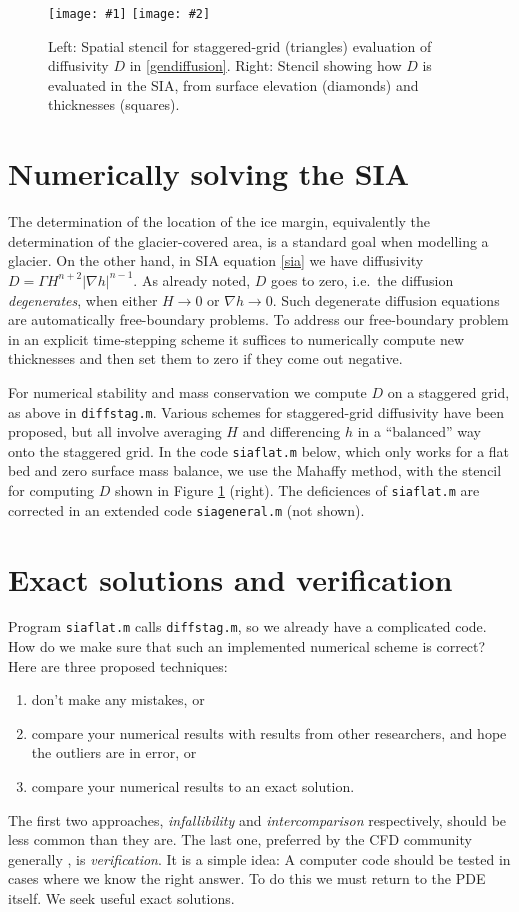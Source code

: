 \documentclass[letterpaper,final,12pt,reqno]{amsart}
\newcommand{\grad}{\nabla}
\newcommand{\minput}[1]{
\vspace{0.8cm}
\VerbatimInput[frame=single,framesep=3mm,label=\fbox{\normalsize \textsl{\,#1.m\,}},fontfamily=courier,fontsize=\footnotesize]{tmp/#1.slim.m}
\vspace{0.5cm}
}
\newcommand{\twofigsizes}[5]{
\begin{figure}[ht]
\centering
\texttt{[image: \#1]} \quad
\texttt{[image: \#2]}
\caption{#3}
\label{fig:#1}
\end{figure}}
\begin{document}
\twofigsizes{diffstencil}{mahaffystencil}{Left:  Spatial stencil for staggered-grid (triangles) evaluation of diffusivity $D$ in \eqref{gendiffusion}.  Right: Stencil showing how $D$ is evaluated in the SIA, from surface elevation (diamonds) and thicknesses (squares).}{2.2in}{2.2in}


\section{Numerically solving the SIA} \label{sec:numericalsia}

The determination of the location of the ice margin, equivalently the determination of the glacier-covered area, is a standard goal when modelling a glacier.  On the other hand, in SIA equation \eqref{sia} we have diffusivity $D = \Gamma H^{n+2} |\grad h|^{n-1}$.  As already noted, $D$ goes to zero, i.e.~the diffusion \emph{degenerates}, when either $H\to 0$ or $\grad h \to 0$.  Such degenerate diffusion equations are automatically free-boundary problems.  To address our free-boundary problem in an explicit time-stepping scheme it suffices to numerically compute new thicknesses and then set them to zero if they come out negative.

For numerical stability and mass conservation we compute $D$ on a staggered grid, as above in \texttt{diffstag.m}.  Various schemes for staggered-grid diffusivity have been proposed, but all involve averaging $H$ and differencing $h$ in a ``balanced'' way onto the staggered grid.  In the code \texttt{siaflat.m} below, which only works for a flat bed and zero surface mass balance, we use the Mahaffy \cite{Mahaffy} method, with the stencil for computing $D$ shown in Figure \ref{fig:diffstencil} (right).  The deficiences of \texttt{siaflat.m} are corrected in an extended code \texttt{siageneral.m} (not shown).

\minput{siaflat}


\section{Exact solutions and verification} \label{sec:exactsolutions}

Program \texttt{siaflat.m} calls \texttt{diffstag.m}, so we already have a complicated code.  How do we make sure that such an implemented numerical scheme is correct?  Here are three proposed techniques:
\begin{enumerate}
  \item don't make any mistakes, or
  \item compare your numerical results with results from other researchers, and hope the outliers are in error, or
  \item compare your numerical results to an exact solution.   \end{enumerate}
The first two approaches, \emph{infallibility} and \emph{intercomparison} respectively, should be less common than they are.  The last one, preferred by the CFD community generally \cite{Roache,Wesseling}, is \emph{verification}.  It is a simple idea:  A computer code should be tested in cases where we know the right answer.  To do this we must return to the PDE itself.  We seek useful exact solutions.
\end{document}
